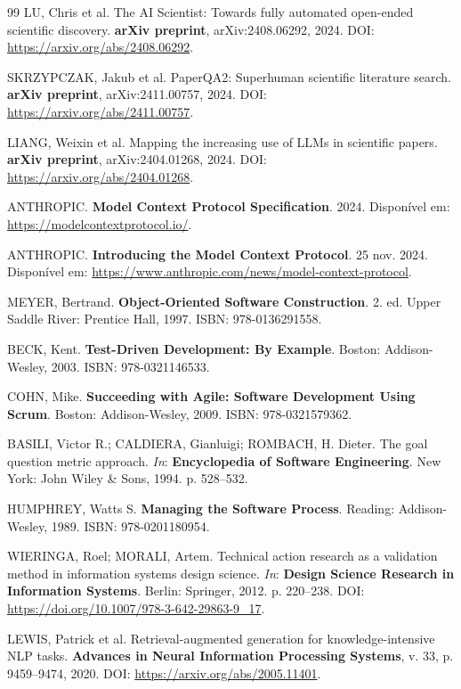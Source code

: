 \begin{thebibliography}{99}
LU, Chris et al. The AI Scientist: Towards fully automated open-ended scientific discovery. \textbf{arXiv preprint}, arXiv:2408.06292, 2024. DOI: \url{https://arxiv.org/abs/2408.06292}.

SKRZYPCZAK, Jakub et al. PaperQA2: Superhuman scientific literature search. \textbf{arXiv preprint}, arXiv:2411.00757, 2024. DOI: \url{https://arxiv.org/abs/2411.00757}.

LIANG, Weixin et al. Mapping the increasing use of LLMs in scientific papers. \textbf{arXiv preprint}, arXiv:2404.01268, 2024. DOI: \url{https://arxiv.org/abs/2404.01268}.

ANTHROPIC. \textbf{Model Context Protocol Specification}. 2024. Disponível em: \url{https://modelcontextprotocol.io/}.

ANTHROPIC. \textbf{Introducing the Model Context Protocol}. 25 nov. 2024. Disponível em: \url{https://www.anthropic.com/news/model-context-protocol}.

MEYER, Bertrand. \textbf{Object-Oriented Software Construction}. 2. ed. Upper Saddle River: Prentice Hall, 1997. ISBN: 978-0136291558.

BECK, Kent. \textbf{Test-Driven Development: By Example}. Boston: Addison-Wesley, 2003. ISBN: 978-0321146533.

COHN, Mike. \textbf{Succeeding with Agile: Software Development Using Scrum}. Boston: Addison-Wesley, 2009. ISBN: 978-0321579362.

BASILI, Victor R.; CALDIERA, Gianluigi; ROMBACH, H. Dieter. The goal question metric approach. \textit{In}: \textbf{Encyclopedia of Software Engineering}. New York: John Wiley \& Sons, 1994. p. 528--532.

HUMPHREY, Watts S. \textbf{Managing the Software Process}. Reading: Addison-Wesley, 1989. ISBN: 978-0201180954.

WIERINGA, Roel; MORALI, Artem. Technical action research as a validation method in information systems design science. \textit{In}: \textbf{Design Science Research in Information Systems}. Berlin: Springer, 2012. p. 220--238. DOI: \url{https://doi.org/10.1007/978-3-642-29863-9_17}.

LEWIS, Patrick et al. Retrieval-augmented generation for knowledge-intensive NLP tasks. \textbf{Advances in Neural Information Processing Systems}, v. 33, p. 9459--9474, 2020. DOI: \url{https://arxiv.org/abs/2005.11401}.


\end{thebibliography}
